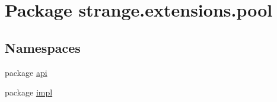 \hypertarget{namespacestrange_1_1extensions_1_1pool}{\section{Package strange.\-extensions.\-pool}
\label{namespacestrange_1_1extensions_1_1pool}
}
\subsection*{Namespaces}
\begin{DoxyCompactItemize}
\item 
package \hyperlink{namespacestrange_1_1extensions_1_1pool_1_1api}{api}
\item 
package \hyperlink{namespacestrange_1_1extensions_1_1pool_1_1impl}{impl}
\end{DoxyCompactItemize}
